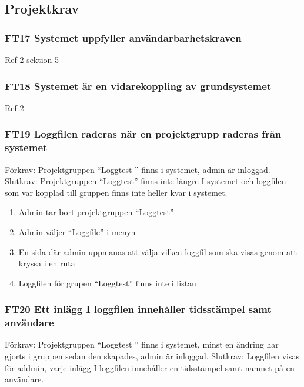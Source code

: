 \documentclass[paper=a4, fontsize=11pt,twoside]{article}
\begin{document}
		\subsection{Projektkrav}
		
		\subsubsection*{FT17 Systemet uppfyller användarbarhetskraven}
		
		Ref 2 sektion 5
		
		
		
		\subsubsection*{FT18 Systemet är en vidarekoppling av grundsystemet}
	
		Ref 2
	
		\subsubsection*{ FT19 Loggfilen raderas när en projektgrupp raderas från
		systemet}

		Förkrav:  Projektgruppen “Loggtest ” finns i systemet, admin är inloggad.
		\newline
		Slutkrav: Projektgruppen “Loggtest” finns inte längre I systemet och loggfilen
		som var kopplad till gruppen finns inte heller kvar i systemet.
		
		
		\begin{enumerate}
		  \item       Admin tar bort projektgruppen “Loggtest”
		  \item      Admin väljer “Loggfile” i menyn
		  \item       En sida där admin uppmanas att välja vilken loggfil som ska visas genom att kryssa i en ruta
		  \item      Loggfilen för grupen “Loggtest” finns inte i listan
		  
		  
		\end{enumerate}
		
		
		
		\subsubsection*{ FT20 Ett inlägg I loggfilen innehåller tidsstämpel samt
		användare}
		
		Förkrav: Projektgruppen “Loggtest ” finns i systemet, minst en ändring har
		gjorts i gruppen sedan den skapades, admin är inloggad.
		\newline
		Slutkrav: Loggfilen visas för addmin, varje inlägg I loggfilen innehåller en
		tidsstämpel samt namnet på en användare.
		
\end{document}
